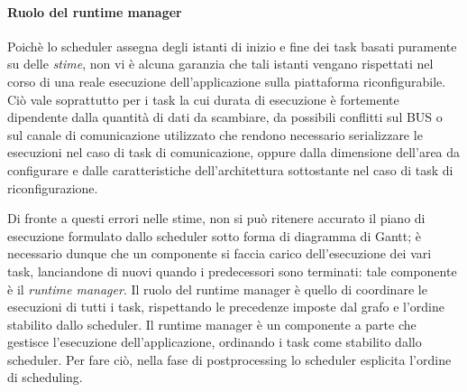 \paragraph{Ruolo del runtime manager}
Poichè lo scheduler assegna degli istanti di inizio e fine dei task basati 
puramente su delle \emph{stime}, non vi è alcuna garanzia che tali istanti 
vengano rispettati nel corso di una reale esecuzione dell'applicazione sulla 
piattaforma riconfigurabile. Ciò vale soprattutto per i task la cui
durata di esecuzione è fortemente dipendente dalla quantità di dati da 
scambiare, da possibili conflitti sul BUS o sul canale di comunicazione 
utilizzato che rendono necessario serializzare le esecuzioni nel caso di 
task di comunicazione, oppure dalla dimensione dell'area da configurare e 
dalle caratteristiche dell'architettura sottostante nel caso di task di 
riconfigurazione.

Di fronte a questi errori nelle stime, non si può ritenere accurato il piano di 
esecuzione formulato dallo scheduler sotto forma di diagramma di Gantt; è 
necessario dunque che un componente si faccia carico dell'esecuzione dei vari 
task, lanciandone di nuovi quando i predecessori sono terminati: tale 
componente è il \emph{runtime manager}. Il ruolo del runtime manager è quello 
di coordinare le esecuzioni di tutti i task, rispettando le precedenze imposte 
dal grafo e l'ordine stabilito dallo scheduler. Il runtime manager \`e un componente
a parte che gestisce l'esecuzione dell'applicazione, ordinando i task come stabilito
dallo scheduler. Per fare ci\`o, nella fase di postprocessing lo scheduler esplicita
l'ordine di scheduling.

